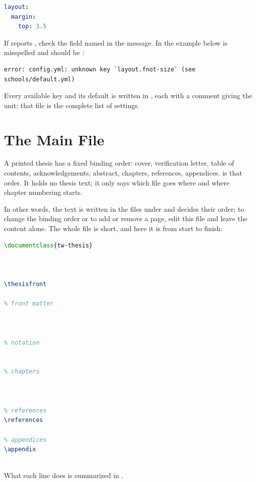 \begin{lstlisting}[language=yaml]
layout:
  margin:
    top: 3.5
\end{lstlisting}

If  reports , check the field named in the message. In the example below  is misspelled and should be :

\begin{lstlisting}
error: config.yml: unknown key `layout.fnot-size` (see schools/default.yml)
\end{lstlisting}

Every available key and its default is written in , each with a comment giving the unit; that file is the complete list of settings.

\section{The Main File}

A printed thesis has a fixed binding order: cover, verification letter, table of contents, acknowledgements, abstract, chapters, references, appendices.  is that order. It holds no thesis text; it only says which file goes where and where chapter numbering starts.

In other words, the text is written in the files under  and  decides their order; to change the binding order or to add or remove a page, edit this file and leave the content alone. The whole file is short, and here it is from start to finish:

\begin{lstlisting}[language=latex]
\documentclass{tw-thesis}



\thesisfront

% front matter



% notation


% chapters



% references
\references

% appendices
\appendix



\end{lstlisting}

What each line does is summarized in .

